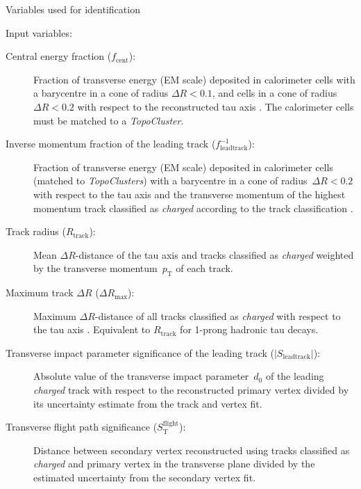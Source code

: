 \begin{table}[ht]
  \centering
  
  \caption{Variables used for identification}
  \label{tab:baseline_variables}
\end{table}


Input variables:
\begin{description}
\item[Central energy fraction ($f_\text{cent}$):] Fraction of transverse energy
  (EM scale) deposited in calorimeter cells with a barycentre in a cone of
  radius $\Delta R < 0.1$, and cells in a cone of radius $\Delta R < 0.2$ with
  respect to the reconstructed tau axis . The
  calorimeter cells must be matched to a \emph{TopoCluster}.

\item[Inverse momentum fraction of the leading track
  ($f_\text{leadtrack}^{-1}$):] Fraction of transverse energy (EM scale)
  deposited in calorimeter cells (matched to \emph{TopoClusters}) with a
  barycentre in a cone of radius~$\Delta R < 0.2$ with respect to the tau axis
   and the transverse momentum of the highest momentum
  track classified as \emph{charged} according to the track classification
  .

\item[Track radius ($R_\text{track}$):] Mean $\Delta R$-distance of the
  tau axis  and tracks classified as \emph{charged}
  weighted by the transverse momentum~$p_\text{T}$ of each track.

\item[Maximum track $\Delta R$ ($\Delta R_\text{max}$):] Maximum
  $\Delta R$-distance of all tracks classified as \emph{charged} with respect to
  the tau axis . Equivalent to $R_\text{track}$
  for 1-prong hadronic tau decays.

\item[Transverse impact parameter significance of the leading track
  ($| S_\text{leadtrack} |$):] Absolute value of the transverse impact
  parameter~$d_0$ of the leading \emph{charged} track with respect to the
  reconstructed primary vertex divided by its uncertainty estimate from the
  track and vertex fit.

\item[Transverse flight path significance ($S_\text{T}^\text{flight}$):]
  Distance between secondary vertex reconstructed using tracks classified as
  \emph{charged} and primary vertex in the transverse plane divided by the
  estimated uncertainty from the secondary vertex fit.


\end{description}
